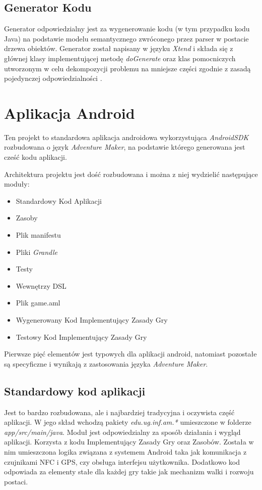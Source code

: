 \documentclass[openright]{xmgr}
\begin{document}
\subsection{Generator Kodu}
Generator odpowiedzialny jest za wygenerowanie kodu (w tym przypadku kodu Java) na podstawie modelu semantycznego zwróconego przez parser w postacie drzewa obiektów. Generator został napisany w języku \textit{Xtend} i składa się z głównej klasy implementującej metodę \textit{doGenerate} oraz klas pomocniczych utworzonym w celu dekompozycji problemu na mniejsze części zgodnie z zasadą pojedynczej odpowiedzialności \cite{CleanCode:2005}.

\section{Aplikacja Android}
Ten projekt to standardowa aplikacja androidowa wykorzystująca \textit{AndroidSDK} rozbudowana o język \textit{Adventure Maker}, na podstawie którego generowana jest cześć kodu aplikacji.

Architektura projektu jest dość rozbudowana i można z niej wydzielić następujące moduły:

\begin{itemize}
	\item Standardowy Kod Aplikacji
	\item Zasoby
	\item Plik manifestu
	\item Pliki \textit{Grandle}
	\item Testy
	\item Wewnętrzy DSL
	\item Plik game.aml
	\item Wygenerowany Kod Implementujący Zasady Gry
	\item Testowy Kod Implementujący Zasady Gry
\end{itemize}

Pierwsze pięć elementów jest typowych dla aplikacji android, natomiast pozostałe są specyficzne i wynikają z zastosowania języka \textit{Adventure Maker}.

\subsection*{Standardowy kod aplikacji} 

Jest to bardzo rozbudowana, ale i najbardziej tradycyjna i oczywista część aplikacji. W jego skład wchodzą pakiety \textit{edu.ug.inf.am.*} umieszczone w folderze \textit{app/src/main/java}. Moduł jest odpowiedzialny za sposób działania i wygląd aplikacji. Korzysta z kodu Implementujący Zasady Gry oraz Zasobów. Została w nim umieszczona logika związana z systemem Android taka jak komunikacja z czujnikami NFC i GPS, czy obsługa interfejsu użytkownika. Dodatkowo kod odpowiada za elementy stałe dla każdej gry takie jak mechanizm walki i rozwoju postaci.
\end{document}
